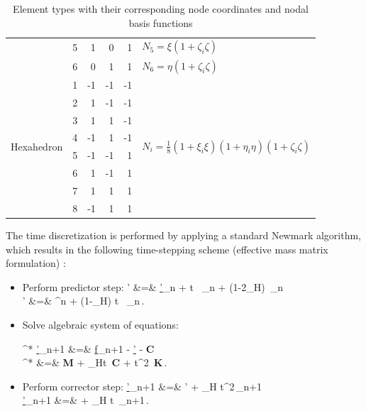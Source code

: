\documentclass[a4paper,10pt]{article}
\begin{document}
\begin{table}[htb]
\begin{tabular}{lcrrrl}
                            & 5 & 1 & 0 &  1 & $N_5 = \xi(1 + \zeta_i\zeta)$\\
                            & 6 & 0 & 1 &  1 & $N_6 = \eta(1 + \zeta_i\zeta)$\\
  \hline
  \multirow{8}{14mm}{Hexahedron} & 1 & -1 & -1 & -1 & \multirow{8}{50mm}{$N_i = \frac{1}{8}(1 + \xi_i\xi)(1 + \eta_i\eta)(1 + \zeta_i\zeta)$}\\
                                 & 2 &  1 & -1 & -1 & \\
                                 & 3 &  1 &  1 & -1 & \\
                                 & 4 & -1 &  1 & -1 & \\
                                 & 5 & -1 & -1 &  1 & \\
                                 & 6 &  1 & -1 &  1 & \\
                                 & 7 &  1 &  1 &  1 & \\
                                 & 8 & -1 &  1 &  1 & \\
  \hline\hline
\end{tabular}
\caption{Element types with their corresponding node coordinates and nodal basis functions \label{basis-functions}}
\end{table}

\newpage
\noindent
The  time  discretization is  performed  by  applying  a standard  Newmark
algorithm, which results in  the following time-stepping scheme (effective
mass matrix formulation) \cite{Kaltenbacher2007}:

\begin{itemize}
\item Perform predictor step:
\underline{\tilde \rho}' &=& \underline {\rho'}_n + \Delta t \, 
_n +  (1-2\beta_{\rm H})\, _n \\
\underline{\tilde{\dot \rho}}' &=& ^n + (1-\gamma_{\rm H}) \Delta t \,
_n\,.
\eea
\smallskip

\item Solve algebraic system of equations:

\bM^* \underline{\ddot \rho'}_{n+1} &=& \underline f_{n+1} - \bK
\underline{\tilde \rho'}
- {\bf C}   \\
\bM^* &=& {\bf M} + \gamma_{\rm H}\Delta t\, {\bf C} +
\beta \Delta t^2\, {\bf K}\,.
\eea
\smallskip

\item Perform corrector step:
\underline{\rho'}_{n+1} &=& {\underline{\tilde \rho}}' + \beta_{\rm H}
\Delta t^2\,_{n+1} \\ 
\underline{\dot{\rho}'}_{n+1} &=& {} + \gamma_{\rm H} \Delta t
\,_{n+1}\,.
\label{eq:Psitdist31}
\eea

\end{itemize}
\bigskip
\end{document}
